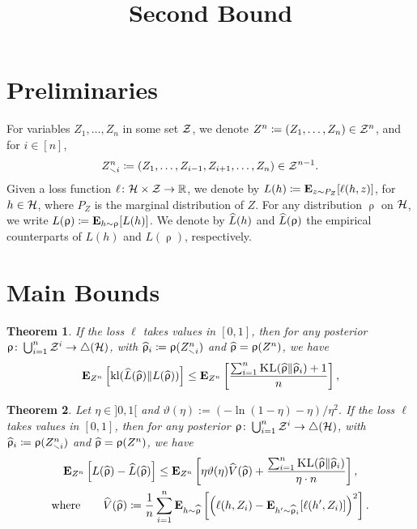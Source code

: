 \documentclass{article}
\title{Second Bound}
\author{%
}
\newcommand{\ro}{\uprho}
\newcommand{\hro}{\what{\uprho}}
\newtheorem{theorem}{Theorem}
\begin{document}
	


\section{Preliminaries}
For variables $Z_1,\dots, Z_n$ in some set $\mathcal Z$, we denote $Z^n \coloneqq (Z_1,\dots,Z_n)\in \mathcal Z^{n}$, and for $i \in[n]$,
\begin{align}
Z^{n}_{\smallsetminus i} \coloneqq (Z_1,\dots, Z_{i-1}, Z_{i+1}, \dots, Z_n) \in \mathcal Z^{n-1}. 
\end{align} 
Given a loss function $\ell\colon \mathcal H \times \mathcal Z \rightarrow {\mathbb R}$, we denote by $L(h) \coloneqq \mathbf{E}_{z\sim P_Z}[\ell(h,z)]$, for $h\in \mathcal H$, where $P_Z$ is the marginal distribution of $Z$. For any distribution $\ro$ on $\mathcal H$, we write $L(\ro)\coloneqq \E_{h\sim \ro}[L(h)]$. We denote by $\widehat L(h)$ and $\what L(\ro)$ the empirical counterparts of $L(h)$ and $L(\ro)$, respectively.


\section{Main Bounds}
\begin{theorem}
	\label{thm:KL}
	If the loss $\ell$ takes values in $[0,1]$, then for any posterior $ \ro \colon \bigcup_{i=1}^n \cZ^i \rightarrow \triangle( \cH)$, with $\hro_i \coloneqq  \ro(Z^n_{\smallsetminus i})$ and $\hro=  \ro(Z^n) $, we have
	\begin{align}
	{\bf E}_{Z^n}  \left[ \kl(\what{L}(\hro) \| L(\hro))\right] \leq 
	{\bf E}_{Z^n } \left[\frac{
		\sum_{i=1}^n \KL(\hro \| \hro_i)+1}{n} \right],
	\end{align}
\end{theorem}

\begin{theorem}
	\label{thm:VP}
	Let $\eta\in]0,1[$ and $\vartheta(\eta) := 
	(- \ln (1-\eta) - \eta)/\eta^2$. If the loss $\ell$ takes values in $[0,1]$, then for any posterior $ \ro \colon \bigcup_{i=1}^n \cZ^i \rightarrow \triangle( \cH)$, with $\hro_i \coloneqq  \ro(Z^n_{\smallsetminus i})$ and $\hro=  \ro(Z^n) $, we have
	\begin{gather} \label{eq:bound}
	\E_{Z^n}\left[ L(\hro) - \what L(\hro)\right] \leq  \E_{Z^n}  \left[\eta \vartheta(\eta) \what V(\hro) + \frac{\sum_{i=1}^n\KL(\hro \| \hro_{i})}{\eta \cdot  n}  \right],\\
	\text{where} \quad \quad  \what V(\hro) \coloneqq  \frac{1}{n} \sum_{i=1}^n \E_{h\sim \hro} \left[ \left(\ell(h, Z_i) - \E_{h'\sim \hro_i}[\ell(h',Z_i)]\right)^2 \right]. \label{eq:theV}
	\end{gather}
\end{theorem}
\end{document}
